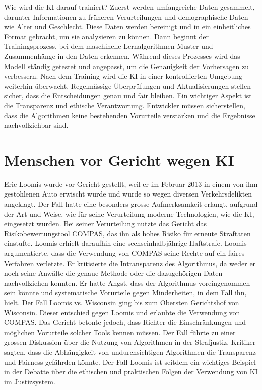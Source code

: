 \documentclass{article}
\begin{document}
Wie wird die KI darauf trainiert? \newline Zuerst werden umfangreiche Daten gesammelt, darunter Informationen zu früheren Verurteilungen und
demographische Daten wie Alter und Geschlecht. Diese Daten werden bereinigt und in ein einheitliches 
Format gebracht, um sie analysieren zu können. \newline Dann beginnt der Trainingsprozess, bei dem maschinelle Lernalgorithmen Muster und Zusammenhänge in den 
Daten erkennen. Während dieses Prozesses wird das Modell ständig getestet und angepasst, um die 
Genauigkeit der Vorhersagen zu verbessern. \newline Nach dem Training wird die KI in einer kontrollierten Umgebung weiterhin überwacht. Regelmässige 
Überprüfungen und Aktualisierungen stellen sicher, dass die Entscheidungen genau und fair bleiben. \newline Ein wichtiger Aspekt ist die Transparenz und ethische Verantwortung. Entwickler müssen sicherstellen, 
dass die Algorithmen keine bestehenden Vorurteile verstärken und die Ergebnisse nachvollziehbar sind. 



\section {Menschen vor Gericht wegen KI}

Eric Loomis wurde vor Gericht gestellt, weil er im Februar 2013 in einem von ihm gestohlenen Auto 
erwischt wurde und wurde so wegen diversen Verkehrsdelikten angeklagt. Der Fall hatte eine besonders grosse 
Aufmerksamkeit erlangt, aufgrund der Art und Weise, wie für seine Verurteilung moderne
Technologien, wie die KI, eingesetzt wurden.  
Bei seiner Verurteilung nutzte das Gericht das Risikobewertungstool COMPAS, das ihn als hohes Risiko für erneute 
Straftaten einstufte. Loomis erhielt daraufhin eine sechseinhalbjährige Haftstrafe.
Loomis argumentierte, dass die Verwendung von COMPAS seine Rechte auf ein faires Verfahren verletzte. Er kritisierte 
die Intransparenz des Algorithmus, da weder er noch seine Anwälte die genaue Methode oder die dazugehörigen Daten 
nachvollziehen konnten. Er hatte Angst, dass der Algorithmus voreingenommen sein könnte und systematische Vorurteile 
gegen Minderheiten, in dem Fall ihn, hielt.
Der Fall Loomis vs. Wisconsin ging bis zum Obersten Gerichtshof von Wisconsin. Dieser entschied gegen Loomis und 
erlaubte die Verwendung von COMPAS. Das Gericht betonte jedoch, dass Richter die Einschränkungen und möglichen Vorurteile 
solcher Tools kennen müssen.
Der Fall führte zu einer grossen Diskussion über die Nutzung von Algorithmen in der Strafjustiz. Kritiker sagten, 
dass die Abhängigkeit von undurchsichtigen Algorithmen die Transparenz und Fairness gefährden könnte. Der Fall Loomis 
ist seitdem ein wichtiges Beispiel in der Debatte über die ethischen und praktischen Folgen der Verwendung 
von KI im Justizsystem.  
\end{document}
